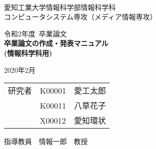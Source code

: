 \begin{titlepage}

\ \\
\begin{center}

{\LARGE 愛知工業大学情報科学部情報科学科\\
コンピュータシステム専攻（メディア情報専攻）

\vspace{1.0cm}

令和2年度~卒業論文\\

\vspace{2.0cm}
{\Huge 
\baselineskip=15mm
\textbf{卒業論文の作成・発表マニュアル\\
(情報科学科用)\\}}

\vspace{7.0cm}

2020年2月\\

\vspace{1.0cm}

\begin{tabular}[h]{lll}
  研究者  & K00001 & 愛工太郎\\
         & K00011 & 八草花子\\
         & X00012 & 愛知環状\\
\end{tabular}

\vspace{1.0cm}

指導教員\ \ 情報一郎\ \ 教授}

\end{center}

\end{titlepage}
